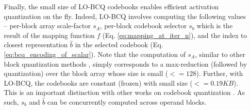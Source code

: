 Finally, the small size of LO-BCQ codebooks enables efficient activation quantization on the fly. Indeed, LO-BCQ involves computing the following values -- per-block array scale-factor $s_A$, per-block codebook selector $s_b$ which is the result of the mapping function $f$ (Eq. \ref{eq:mapping_at_iter_n}), and the index to closest representation $\hat{b}$ in the selected codebook (Eq. \ref{eq:bcq_encoding_of_scalar}). Note that the computation of $s_A$, similar to other block quantization methods \citep{rouhani2023shared,dai2021vsq}, simply corresponds to a max-reduction (followed by quantization) over the block array whose size is small ($<=128$). Further, with LO-BCQ, the codebooks are constant (frozen) with small size ($<=0.19KB$). This is an important distinction with other works on codebook quantization \citep{tseng2024quipbetterllmquantization,egiazarian2024aqlm}. As such, $s_b$ and $\hat{b}$ can be concurrently computed across operand blocks.










